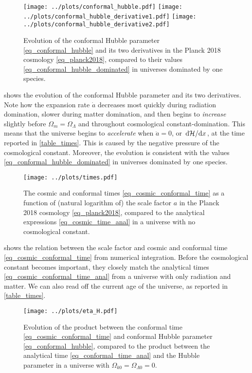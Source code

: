\documentclass[10pt,a4paper]{article}
\begin{document}
\begin{figure}
	\centering
	\texttt{[image: ../plots/conformal\_hubble.pdf]}
	\texttt{[image: ../plots/conformal\_hubble\_derivative1.pdf]}
	\texttt{[image: ../plots/conformal\_hubble\_derivative2.pdf]}
	\caption{%
		Evolution of the conformal Hubble parameter \eqref{eq_conformal_hubble} and its two derivatives in the Planck 2018 cosmology \eqref{eq_planck2018},
		compared to their values \eqref{eq_conformal_hubble_dominated} in universes dominated by one species.}
	\label{fig_conformal_hubble}
\end{figure}

 shows the evolution of the conformal Hubble parameter and its two derivatives.
Note how the expansion rate $\dot{a}$ decreases most quickly during radiation domination,
slower during matter domination,
and then begins to \emph{increase} slightly before $\Omega_m = \Omega_\Lambda$ and throughout cosmological constant-domination.
This means that the universe begins to \emph{accelerate} when $\ddot{a}=0$, or $\odv{\mathcal{H}}/{x}$, at the time reported in \cref{table_times}.
This is caused by the negative pressure of the cosmological constant.
Moreover, the evolution is consistent with the values \eqref{eq_conformal_hubble_dominated} in universes dominated by one species.

\begin{figure}
	\centering
	\texttt{[image: ../plots/times.pdf]}
	\caption{The cosmic and conformal times \eqref{eq_cosmic_conformal_time} as a function of (natural logarithm of) the scale factor $a$ in the Planck 2018 cosmology \eqref{eq_planck2018}, compared to the analytical expressions \eqref{eq_cosmic_time_anal} in a universe with no cosmological constant.}
	\label{fig_cosmic_conformal_time}
\end{figure}

 shows the relation between the scale factor and cosmic and conformal time \eqref{eq_cosmic_conformal_time} from numerical integration.
Before the cosmological constant becomes important, they closely match the analytical times \eqref{eq_cosmic_conformal_time_anal} from a universe with only radiation and matter.
We can also read off the current age of the universe, as reported in \cref{table_times}.

\begin{figure}
	\centering
	\texttt{[image: ../plots/eta\_H.pdf]}
	\caption{%
		Evolution of the product between the conformal time \eqref{eq_cosmic_conformal_time} and conformal Hubble parameter \eqref{eq_conformal_hubble},
		compared to the product between the analytical time \eqref{eq_conformal_time_anal} and the Hubble parameter in a universe with $\Omega_{k0}=\Omega_{\Lambda0}=0$.
	}
	\label{fig_eta_H}
\end{figure}
\end{document}
